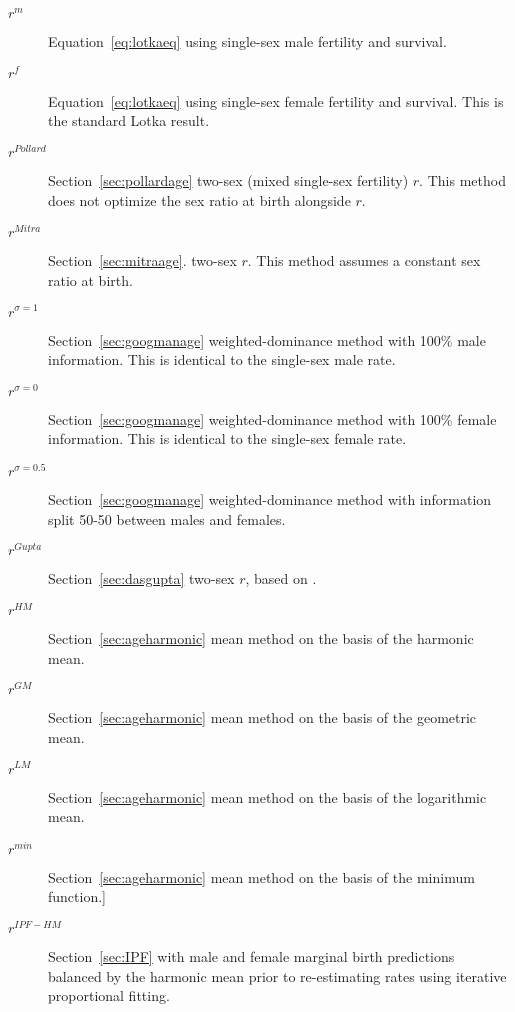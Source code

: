 \begin{description}
  \item[$r^m$] Equation~\eqref{eq:lotkaeq} using single-sex male fertility and
  survival.
  \item[$r^f$] Equation~\eqref{eq:lotkaeq} using single-sex female fertility and
  survival. This is the standard Lotka result.
  \item[$r^{Pollard}$] Section~\ref{sec:pollardage} two-sex (mixed single-sex
  fertility) $r$. This method does not optimize the sex ratio at birth alongside $r$.
  \item[$r^{Mitra}$] Section~\ref{sec:mitraage}. two-sex $r$. This method
  assumes a constant sex ratio at birth.
  \item[$r^{\sigma=1}$] Section~\ref{sec:googmanage} weighted-dominance
  method with 100\% male information. This is identical to the single-sex male rate.
  \item[$r^{\sigma=0}$] Section~\ref{sec:googmanage} weighted-dominance
  method with 100\% female information. This is identical to the single-sex female rate.
  \item[$r^{\sigma=0.5}$] Section~\ref{sec:googmanage} weighted-dominance
  method with information split 50-50 between males and females.
  \item[$r^{Gupta}$] Section~\ref{sec:dasgupta} two-sex $r$, based on
  \citet{gupta1978alternative}.
  \item[$r^{HM}$] Section~\ref{sec:ageharmonic} mean method on the basis of
  the harmonic mean.
  \item[$r^{GM}$] Section~\ref{sec:ageharmonic} mean method on the basis of
  the geometric mean.
  \item[$r^{LM}$] Section~\ref{sec:ageharmonic} mean method on the basis of
  the logarithmic mean.
  \item[$r^{min}$] Section~\ref{sec:ageharmonic} mean method on the basis
  of the minimum function.]
  \item[$r^{IPF-HM}$] Section~\ref{sec:IPF} with male and female marginal
  birth predictions balanced by the harmonic mean prior to re-estimating rates
  using iterative proportional fitting.
\end{description}

